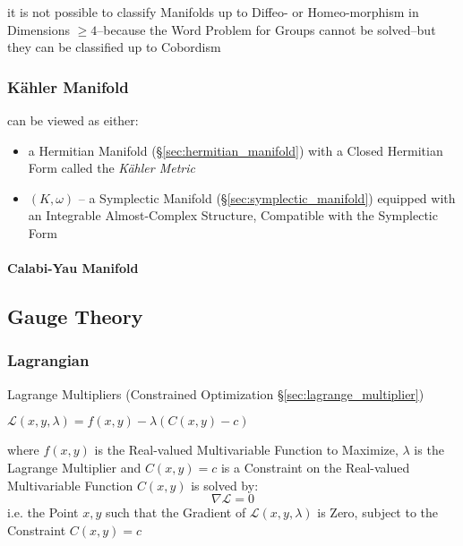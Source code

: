 it is not possible to classify Manifolds up to Diffeo- or Homeo-morphism in
Dimensions $\geq 4$--because the Word Problem for Groups cannot be solved--but
they can be classified up to Cobordism




\subsubsection{K\"ahler Manifold}\label{sec:kahler_manifold}

can be viewed as either:

\begin{itemize}
\item a Hermitian Manifold (\S\ref{sec:hermitian_manifold}) with a
  Closed Hermitian Form called the \emph{K\"ahler Metric} %
\item $(K,\omega)$ -- a Symplectic Manifold
  (\S\ref{sec:symplectic_manifold}) equipped with an Integrable
  Almost-Complex Structure, Compatible with the Symplectic Form %
\end{itemize}



\paragraph{Calabi-Yau Manifold}\label{sec:calabi_yau_manifold}



\subsection{Gauge Theory}\label{sec:gauge_theory}


\subsubsection{Lagrangian}\label{sec:lagrangian}

\fist Lagrange Multipliers (Constrained Optimization
\S\ref{sec:lagrange_multiplier})

$\mathcal{L}(x,y,\lambda) = f(x,y) - \lambda (C(x,y) - c)$

where $f(x,y)$ is the Real-valued Multivariable Function to Maximize, $\lambda$
is the Lagrange Multiplier and $C(x,y) = c$ is a Constraint on the Real-valued
Multivariable Function $C(x,y)$ is solved by:
\[
  \nabla\mathcal{L} = 0
\]
i.e. the Point $x,y$ such that the Gradient of $\mathcal{L}(x,y,\lambda)$ is
Zero, subject to the Constraint $C(x,y) = c$

